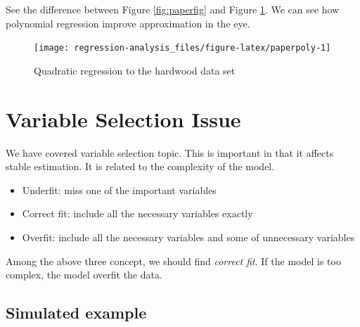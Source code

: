 \documentclass[]{book}
\newenvironment{Shaded}{\begin{snugshade}}{\end{snugshade}}
\newcommand{\DataTypeTok}[1]{\textcolor[rgb]{0.13,0.29,0.53}{#1}}
\newcommand{\DecValTok}[1]{\textcolor[rgb]{0.00,0.00,0.81}{#1}}
\newcommand{\KeywordTok}[1]{\textcolor[rgb]{0.13,0.29,0.53}{\textbf{#1}}}
\newcommand{\NormalTok}[1]{#1}
\newcommand{\OperatorTok}[1]{\textcolor[rgb]{0.81,0.36,0.00}{\textbf{#1}}}
\newcommand{\StringTok}[1]{\textcolor[rgb]{0.31,0.60,0.02}{#1}}
\providecommand{\tightlist}{%
  \setlength{\itemsep}{0pt}\setlength{\parskip}{0pt}}
\theoremstyle{definition}
\theoremstyle{definition}
\theoremstyle{definition}
\theoremstyle{remark}
\begin{document}
See the difference between Figure \ref{fig:paperfig} and Figure \ref{fig:paperpoly}. We can see how polynomial regression improve approximation in the eye.

\begin{Shaded}
\end{Shaded}

\begin{figure}[H]

{\centering \texttt{[image: regression-analysis\_files/figure-latex/paperpoly-1]} 

}

\caption{Quadratic regression to the hardwood data set}\label{fig:paperpoly}
\end{figure}

\hypertarget{variable-selection-issue}{%
\section{Variable Selection Issue}\label{variable-selection-issue}}

We have covered variable selection topic. This is important in that it affects stable estimation. It is related to the complexity of the model.

\begin{itemize}
\tightlist
\item
  Underfit: miss one of the important variables
\item
  Correct fit: include all the necessary variables exactly
\item
  Overfit: include all the necessary variables and some of unnecessary variables
\end{itemize}

Among the above three concept, we should find \emph{correct fit}. If the model is too complex, the model overfit the data.

\hypertarget{simulated-example}{%
\subsection{Simulated example}\label{simulated-example}}
\end{document}
